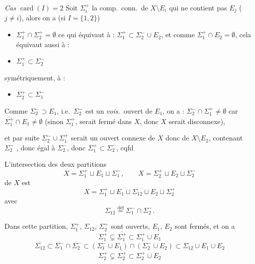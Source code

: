 \documentclass[11pt,a4paper]{article}
\begin{document}
\emph{Cas $\operatorname{card}(I)=2$} Soit $\Sigma_i^+$ la comp.\ conn.\ de $X\setminus E_i$ qui ne contient pas $E_j$ ($j\neq i$), alors on a (si
$I=\{1,2\}$)
\begin{itemize}
  \item[(1)] $\Sigma_1^+\cap\Sigma_2^+=\emptyset$ ce qui
    équivaut à :
   $\Sigma_1^+\subset\Sigma_2^-\cup
  E_2$, et comme $\Sigma_1^+\cap E_2=\emptyset$, cela équivaut
   aussi à :
  \item[(2)] $\Sigma_1^+\subset\Sigma_2^-$
\end{itemize}
symétriquement, à :
\begin{itemize}
  \item[(2')] $\Sigma_2^+\subset\Sigma_1^-$
\end{itemize}
Comme $\Sigma_2^-\supset E_1$,  i.e.\ $\Sigma_2^-$ est
un \emph{vois.}\ ouvert de $E_1$,  on a :
$\Sigma_2^-\cap\Sigma_1^+\neq\emptyset$ car
$\overline{\Sigma_1^+}\cap E_1\neq\emptyset$ (sinon $\Sigma_1^+$,
 serait fermé dans $X$, donc 
$X$ serait disconnexe),

et par suite $\Sigma_2^-\cup\Sigma_1^+$ serait un ouvert connexe de $X$ donc
de $X\setminus E_2$, contenant \ $\Sigma_2^-$
, donc \struck{\ill{}} égal à $\Sigma_2^-$, donc
$\Sigma_1^+\subset\Sigma_2^-$, cqfd

L'intersection des deux partitions
\[
X = \Sigma_1^+\sqcup E_1\sqcup\Sigma_1^-, \qquad
X = \Sigma_2^+\sqcup E_2\sqcup\Sigma_2^-
\]
de $X$ est
\[
X = \Sigma_1^+\sqcup E_1\sqcup\Sigma_{12}\sqcup E_2\sqcup\Sigma_2^+
\]
avec
\[
\Sigma_{12} \overset{\mathrm{déf}}{=} \Sigma_1^-\cap\Sigma_2^- .
\]

Dans cette partition, $\Sigma_1^+$, $\Sigma_{12}$, $\Sigma_2^+$ sont ouverts,
$E_1$, $E_2$ sont fermés, et on a
\[
\Sigma_1^+ \subsetneq \overline{\Sigma_1^+} \subset \Sigma_1^+\cup E_1
\]
\[
\overline{\Sigma_{12}} \subset \overline{\Sigma_1^-}\cap
\overline{\Sigma_2^-} \subset (\Sigma_1^-\cup E_1)\cap(\Sigma_2^-\cup E_2)
\subset \Sigma_{12}\cup E_1\cup E_2
\]
\[
\Sigma_2^+ \subsetneq \overline{\Sigma_2^+} \subset \Sigma_2^+\cup E_2
\]
\end{document}

